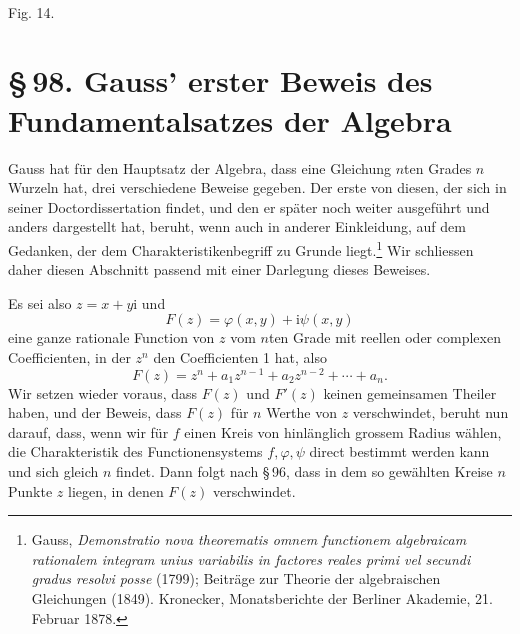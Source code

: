 \documentclass[11pt]{article}
\providecommand{\sect}[2]{\section*{\S\,#1. #2}}
\providecommand{\ii}{\mathrm{i}}
\begin{document}
\begin{center}
\\[-0.2em]
{\small Fig. 14.}
\end{center}


\sect{98}{Gauss' erster Beweis des Fundamentalsatzes der Algebra}

Gauss hat für den Hauptsatz der Algebra, dass eine Gleichung $n$ten Grades $n$ Wurzeln hat, drei verschiedene Beweise gegeben. Der erste von diesen, der sich in seiner Doctordissertation findet, und den er später noch weiter ausgeführt und anders dargestellt hat, beruht, wenn auch in anderer Einkleidung, auf dem Gedanken, der dem Charakteristikenbegriff zu Grunde liegt.\footnote{Gauss, \emph{Demonstratio nova theorematis omnem functionem algebraicam rationalem integram unius variabilis in factores reales primi vel secundi gradus resolvi posse} (1799); Beiträge zur Theorie der algebraischen Gleichungen (1849). Kronecker, Monatsberichte der Berliner Akademie, 21. Februar 1878.} Wir schliessen daher diesen Abschnitt passend mit einer Darlegung dieses Beweises.

Es sei also $z=x+y\ii$ und
\begin{equation}
        F(z)=\varphi(x,y)+\ii\psi(x,y)
\tag{1}
\end{equation}
eine ganze rationale Function von $z$ vom $n$ten Grade mit reellen oder complexen Coefficienten, in der $z^n$ den Coefficienten 1 hat, also
\begin{equation}
        F(z)=z^n+a_1z^{n-1}+a_2z^{n-2}+\cdots+a_n.
\tag{2}
\end{equation}
Wir setzen wieder voraus, dass $F(z)$ und $F'(z)$ keinen gemeinsamen Theiler haben, und der Beweis, dass $F(z)$ für $n$ Werthe von $z$ verschwindet, beruht nun darauf, dass, wenn wir für $f$ einen Kreis von hinlänglich grossem Radius wählen, die Charakteristik des Functionensystems $f,\varphi,\psi$ direct bestimmt werden kann und sich gleich $n$ findet. Dann folgt nach \S\,96, dass in dem so gewählten Kreise $n$ Punkte $z$ liegen, in denen $F(z)$ verschwindet.
\end{document}
